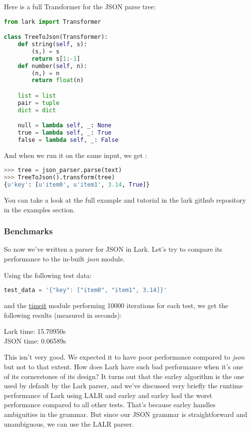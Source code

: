 \documentclass[12pt]{article}
\begin{document}
Here is a full Transformer for the JSON parse tree:

\begin{lstlisting}[language=Python]
from lark import Transformer

class TreeToJson(Transformer):
    def string(self, s):
        (s,) = s
        return s[1:-1]
    def number(self, n):
        (n,) = n
        return float(n)

    list = list
    pair = tuple
    dict = dict

    null = lambda self, _: None
    true = lambda self, _: True
    false = lambda self, _: False
\end{lstlisting}

And when we run it on the same input, we get :

\begin{lstlisting}[language=Python]
>>> tree = json_parser.parse(text)
>>> TreeToJson().transform(tree)
{u'key': [u'item0', u'item1', 3.14, True]}
\end{lstlisting}

You can take a look at the full example and tutorial in the lark github repository in the examples section.

\subsubsection{Benchmarks}
So now we've written a parser for JSON in Lark. Let's try to compare its performance to the in-built \emph{json} module.

Using the following test data:
\begin{lstlisting}[language=Python]
test_data = '{"key": ["item0", "item1", 3.14]}'
\end{lstlisting}

and the \href{https://docs.python.org/3/library/timeit.html}{timeit} module performing 10000 iterations for each test, we get the following results (measured in seconds):

Lark time:  15.70950s \\
JSON time:  0.06589s

This isn't very good. We expected it to have poor performance compared to \emph{json} but not to that extent. How does Lark have such bad performance when it's one of its cornerstones of its design? It turns out that the earley algorithm is the one used by default by the Lark parser, and we've discussed very briefly the runtime performance of Lark using LALR and earley and earley had the worst performance compared to all other tests. That's because earley handles ambiguities in the grammar. But since our JSON grammar is straightforward and unambiguous, we can use the LALR parser.
\end{document}
